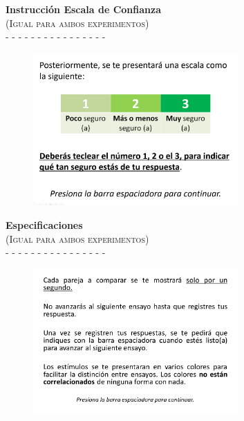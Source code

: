 \documentclass[a4paper ]{article}
\begin{document}
\begin{center}
{\LARGE \textbf{Instrucción Escala de Confianza}}\\
{\large \textsc{(Igual para ambos experimentos)}}\\
-  -  -  -  -  -  -  -  -  -  -  -  -  -  -  -
\smallskip
\end{center}
\vspace{3mm}
\begin{figure}[th]
\centering
\includegraphics[width=0.7\textwidth]{Figures/Inst_Regla}  
\end{figure}
\clearpage








\begin{center}
{\LARGE \textbf{Especificaciones}}\\
{\large \textsc{(Igual para ambos experimentos)}}\\
-  -  -  -  -  -  -  -  -  -  -  -  -  -  -  -
\smallskip
\end{center}
\vspace{3mm}
\begin{figure}[th]
\centering
\includegraphics[width=0.7\textwidth]{Figures/Inst_3}  
\end{figure}
\clearpage
\end{document}
